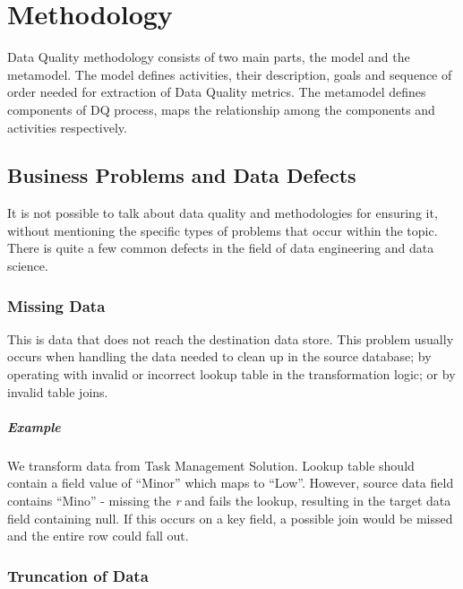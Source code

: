\chapter{Methodology}\label{ch:methodology}

Data Quality methodology consists of two main parts, the model and the metamodel.
The model defines activities, their description, goals and sequence of order needed for extraction of Data Quality metrics.
The metamodel defines components of DQ process, maps the relationship among the components and activities respectively.

\section{Business Problems and Data Defects}

It is not possible to talk about data quality and methodologies for ensuring it, without mentioning the specific types of problems that occur within the topic.
There is quite a few common defects in the field of data engineering and data science.

\subsection*{Missing Data}

This is data that does not reach the destination data store.
This problem usually occurs when handling the data needed to clean up in the source database; by operating with invalid or incorrect lookup table in the transformation logic; or by invalid table joins.

\paragraph*{Example} We transform data from Task Management Solution.
Lookup table should contain a field value of \enquote{Minor} which maps to \enquote{Low}.
However, source data field contains \enquote{Mino} - missing the \textit{r} and fails the lookup, resulting in the target data field containing null.
If this occurs on a key field, a possible join would be missed and the entire row could fall out.

\subsection*{Truncation of Data}

